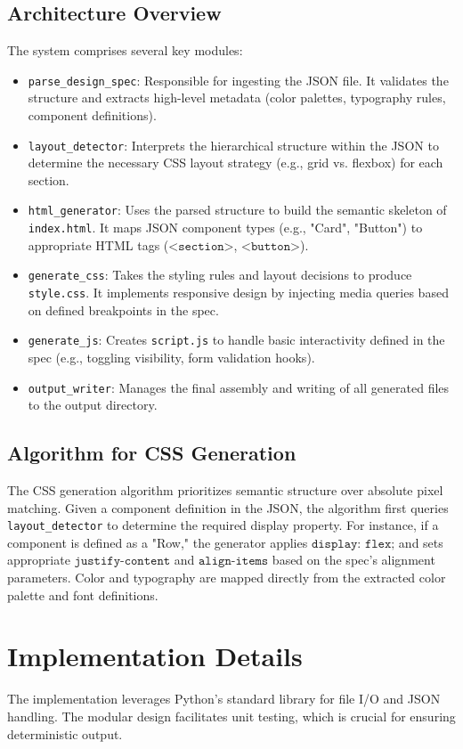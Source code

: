 \documentclass[11pt,a4paper]{article}
\begin{document}
\subsection{Architecture Overview}
The system comprises several key modules:
\begin{itemize}
    \item \texttt{parse\_design\_spec}: Responsible for ingesting the JSON file. It validates the structure and extracts high-level metadata (color palettes, typography rules, component definitions).
    \item \texttt{layout\_detector}: Interprets the hierarchical structure within the JSON to determine the necessary CSS layout strategy (e.g., grid vs. flexbox) for each section.
    \item \texttt{html\_generator}: Uses the parsed structure to build the semantic skeleton of \texttt{index.html}. It maps JSON component types (e.g., "Card", "Button") to appropriate HTML tags ($\texttt{<section>}$, $\texttt{<button>}$).
    \item \texttt{generate\_css}: Takes the styling rules and layout decisions to produce \texttt{style.css}. It implements responsive design by injecting media queries based on defined breakpoints in the spec.
    \item \texttt{generate\_js}: Creates \texttt{script.js} to handle basic interactivity defined in the spec (e.g., toggling visibility, form validation hooks).
    \item \texttt{output\_writer}: Manages the final assembly and writing of all generated files to the output directory.
\end{itemize}

\subsection{Algorithm for CSS Generation}
The CSS generation algorithm prioritizes semantic structure over absolute pixel matching. Given a component definition in the JSON, the algorithm first queries \texttt{layout\_detector} to determine the required display property. For instance, if a component is defined as a "Row," the generator applies $\texttt{display: flex;}$ and sets appropriate $\texttt{justify-content}$ and $\texttt{align-items}$ based on the spec's alignment parameters. Color and typography are mapped directly from the extracted color palette and font definitions.

\section{Implementation Details}
The implementation leverages Python's standard library for file I/O and JSON handling. The modular design facilitates unit testing, which is crucial for ensuring deterministic output.
\end{document}
